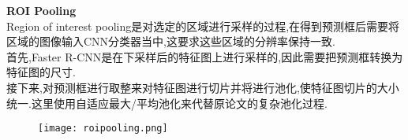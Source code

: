 

\begin{frame}
    \vspace{0.5em}
    \noindent\large\textbf{ROI Pooling}\\
    \vspace{0.5em}
    Region of interest pooling是对选定的区域进行采样的过程,在得到预测框后需要将区域的图像输入CNN分类器当中,这要求这些区域的分辨率保持一致.\\
    \vspace{0.2em}
    首先,Faster R-CNN是在下采样后的特征图上进行采样的,因此需要把预测框转换为特征图的尺寸.\\
    \vspace{0.2em}
    接下来,对预测框进行取整来对特征图进行切片并将进行池化,使特征图切片的大小统一.这里使用自适应最大/平均池化来代替原论文的复杂池化过程.
    \begin{figure}
        \texttt{[image: roipooling.png]}
    \end{figure}
\end{frame}



